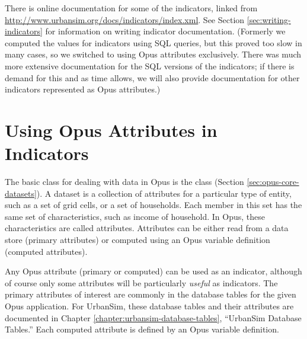 There is online documentation for some of the indicators, 
linked from \url{http://www.urbansim.org/docs/indicators/index.xml}.  
See Section \ref{sec:writing-indicators} for information on writing indicator
\indicatorsindex documentation.  (Formerly we computed the values for
indicators using SQL queries, but this proved too slow in many cases, so we
switched to using Opus attributes exclusively.  There was much more
extensive documentation for the SQL versions of the indicators; if there is
demand for this and as time allows, we will also provide documentation for
other indicators represented as Opus attributes.)

\section{Using Opus Attributes in Indicators}

The basic class for dealing with data in Opus is the class 
\datasetindex (Section \ref{sec:opus-core-datasets}).  A dataset
\datasetindex is a collection of attributes \attributesindex for a
particular type of entity, such as a set of grid cells, or a set of
households.  Each member in this set has the same set of characteristics,
such as income of household.  In Opus, these characteristics are called
attributes. \attributesindex Attributes \attributesindex can be either read
from a data store (primary attributes) \primaryattributesindex or computed
using an Opus variable definition (computed
attributes). \computedattributesindex

Any Opus attribute \attributesindex (primary or computed)
\computedattributesindex\primaryattributesindex can be used as an
indicator, \indicatorsindex although of course only some attributes
\attributesindex will be particularly \emph{useful} as
indicators. \indicatorsindex The primary attributes \primaryattributesindex
of interest are commonly in the database tables for the given Opus
application.  For UrbanSim, these database tables and their attributes
\attributesindex are documented in Chapter
\ref{chapter:urbansim-database-tables}, ``UrbanSim Database Tables.''  
Each computed attribute
\computedattributesindex is defined by an Opus variable \variablesindex
definition.

